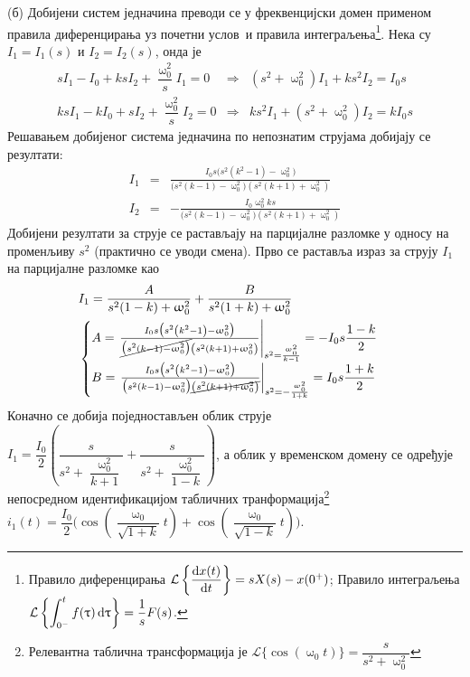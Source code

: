 (б) Добијени систем једначина преводи се у фреквенцијски домен применом правила диференцирања 
уз почетни услов\ и правила интеграљења\footnote{Правило диференцирања $\mathcal{L} \left\{ \dfrac{{\rm d} x(t)}{{\rm d} t} \right\}
= s X(s) - x(0^+)$; Правило интеграљења 
$\displaystyle \mathcal{L} \left\{ \int_{0^-}^{t} f(\uptau) \, {\rm d} \uptau \right\} = \dfrac{1}{s} F(s)$. }. 
Нека су $I_1 = I_1(s)$ и $I_2 = I_2(s)$, онда је
\begin{eqnarray}
    sI_1 - I_0 + ksI_2 + \dfrac{\upomega_0^2}{s} I_1 = 0
    & \Rightarrow & 
    (s^2 + \upomega_0^2) I_1 + ks^2 I_2 = I_0 s \\
    ksI_1 - kI_0 + sI_2 + \dfrac{\upomega_0^2}{s} I_2 = 0
    & \Rightarrow & 
    ks^2 I_1 + (s^2 + \upomega_0^2) I_2 = k I_0 s
\end{eqnarray}
Решавањем добијеног система једначина по непознатим струјама добијају се резултати: 
\begin{eqnarray}
    I_1 &=& \frac{I_{0} s \bigl(s^{2} \left(k^{2} - 1\right) - \upomega_{0}^{2} \bigr)}{\bigl(s^{2} \left(k - 1\right) - \upomega_{0}^{2} \bigr) \left(s^{2} \left(k + 1\right) + \upomega_{0}^{2}\right)} \\[2mm]
    I_2 &=& - \frac{I_{0} \upomega_{0}^{2} k s}{\bigl(s^{2} \left(k - 1\right) - \upomega_{0}^{2} \bigr) \left(s^{2} \left(k + 1\right) + \upomega_{0}^{2}\right)}
    \label{eq:\ID_i2s}
\end{eqnarray}
Добијени резултати за струје се растављају на парцијалне разломке у односу на променљиву 
$s^2$ (практично се уводи смена). Прво се раставља израз за струју $I_1$ на парцијалне разломке
као
\begin{eqnarray}
    &I_1 = \dfrac{A}{s^2(1 - k) + \upomega_0^2} + \dfrac{B}{s^2(1+k) + \upomega_0^2} \\ 
    &
    \begin{cases}
    A = 
    \left.
    \frac{I_{0} s \bigl(s^{2} \left(k^{2} - 1\right) - \upomega_{0}^{2} \bigr)}
    { \cancel{\bigl(s^{2} \left(k - 1\right) - \upomega_{0}^{2} \bigr)} \left(s^{2} \left(k + 1\right) + \upomega_{0}^{2}\right)}
    \right\rvert_{s^2 = \frac{\upomega_0^2}{k-1}}
    = -I_0 s \dfrac{1-k}{2} 
        \\    
    B = \left.
        \frac{I_{0} s \bigl(s^{2} \left(k^{2} - 1\right) - \upomega_{0}^{2} \bigr)}
        { \bigl(s^{2} \left(k - 1\right) - \upomega_{0}^{2} \bigr) \cancel{\left(s^{2} \left(k + 1\right) + \upomega_{0}^{2}\right)}}
    \right\rvert_{s^2 = -\frac{\upomega_0^2}{1 + k}}
    = I_0 s \dfrac{1+k}{2}
    \end{cases}
\end{eqnarray}
Коначно се добија поједностављен облик струје $I_1 = 
\dfrac{I_0}{2} \left(  
    \dfrac{s}{s^2 + \dfrac{\upomega_0^2}{k+1} }
    +
    \dfrac{s}{s^2 + \dfrac{\upomega_0^2}{1-k}}
\right)$,
а облик у временском домену се одређује непосредном идентификацијом табличних 
транформација\footnote{Релевантна таблична трансформација је 
$\mathcal{L} \{ \cos(\upomega_0 t) \} = \dfrac{s}{s^2 + \upomega_0^2} $}
$i_1(t) = \dfrac{I_0}{2} 
\Biggl(
    \cos \left( \dfrac{\upomega_0}{\sqrt{1+k}}t\right) + \cos\left(\dfrac{\upomega_0}{\sqrt{1-k}}t\right) 
\Biggr)$. 

